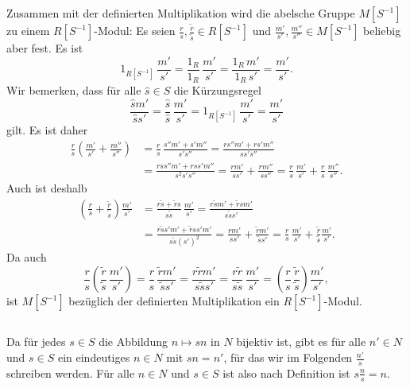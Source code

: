 \documentclass[a4paper,10pt]{article}
\theoremstyle{definition}
\begin{document}
Zusammen mit der definierten Multiplikation wird die abelsche Gruppe $M[S^{-1}]$ zu einem $R[S^{-1}]$-Modul: Es seien $\frac{r}{s}, \frac{\tilde{r}}{\tilde{s}} \in R[S^{-1}]$ und $\frac{m'}{s'}, \frac{m''}{s''} \in M[S^{-1}]$ beliebig aber fest. Es ist
\[
 1_{R[S^{-1}]} \,\frac{m'}{s'}
 = \frac{1_R}{1_R} \, \frac{m'}{s'}
 = \frac{1_R \, m'}{1_R \, s'}
 = \frac{m'}{s'}.
\]
Wir bemerken, dass für alle $\hat{s} \in S$ die Kürzungsregel
\[
 \frac{\hat{s}m'}{\hat{s}s'}
 = \frac{\hat{s}}{\hat{s}} \, \frac{m'}{s'}
 = 1_{R[S^{-1}]} \, \frac{m'}{s'}
 = \frac{m'}{s'}
\]
gilt. Es ist daher
\begin{align*}
 \frac{r}{s} \left( \frac{m'}{s'} + \frac{m''}{s''} \right)
 &= \frac{r}{s} \, \frac{s''m' + s'm''}{s's''}
 = \frac{rs''m' + rs'm''}{ss's''} \\
 &= \frac{rss''m' + rss'm''}{s^2s's''}
 = \frac{rm'}{ss'} + \frac{rm''}{ss''}
 = \frac{r}{s} \, \frac{m'}{s'} + \frac{r}{s} \, \frac{m''}{s''}.
\end{align*}
Auch ist deshalb
\begin{align*}
 \left(\frac{r}{s} + \frac{\tilde{r}}{\tilde{s}}\right) \frac{m'}{s'}
 &= \frac{r\tilde{s}+\tilde{r}s}{s\tilde{s}} \, \frac{m'}{s'}
 = \frac{r\tilde{s}m' + \tilde{r}sm'}{s\tilde{s}s'} \\
 &= \frac{r\tilde{s}s'm' + \tilde{r}ss'm'}{s\tilde{s}(s')^2}
 = \frac{rm'}{ss'} + \frac{\tilde{r}m'}{\tilde{s}s'}
 = \frac{r}{s} \, \frac{m'}{s'} + \frac{\tilde{r}}{\tilde{s}} \frac{m'}{s'}.
\end{align*}
Da auch
\[
 \frac{r}{s} \left(\frac{\tilde{r}}{\tilde{s}} \, \frac{m'}{s'}\right)
 = \frac{r}{s} \, \frac{\tilde{r} m'}{\tilde{s} s'}
 = \frac{r \tilde{r} m'}{s \tilde{s} s'}
 = \frac{r \tilde{r}}{s \tilde{s}} \, \frac{m'}{s'}
 = \left( \frac{r}{s} \, \frac{\tilde{r}}{\tilde{s}} \right) \frac{m'}{s'},
\]
ist $M[S^{-1}]$ bezüglich der definierten Multiplikation ein $R[S^{-1}]$-Modul.


\subsection{}
Da für jedes $s \in S$ die Abbildung $n \mapsto s n$ in $N$ bijektiv ist, gibt es für alle $n' \in N$ und $s \in S$ ein eindeutiges $n \in N$ mit $sn = n'$, für das wir im Folgenden $\frac{n'}{s}$ schreiben werden. Für alle $n \in N$ und $s \in S$ ist also nach Definition ist $s \frac{n}{s} = n$.
\end{document}

